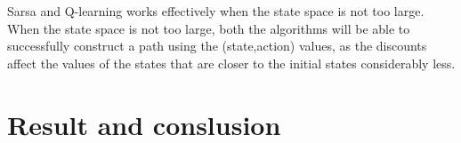 \documentclass[11pt]{article}
\begin{document}
\begin{enumerate}
		Sarsa and Q-learning works effectively when the state space is not too large. When the state space is not too large, both the algorithms will be able to successfully construct a path using the (state,action) values, as the discounts affect the values of the states that are closer to the initial states considerably less.
	\end{enumerate}
\section{Result and conslusion}
\section {}
\end{document}
